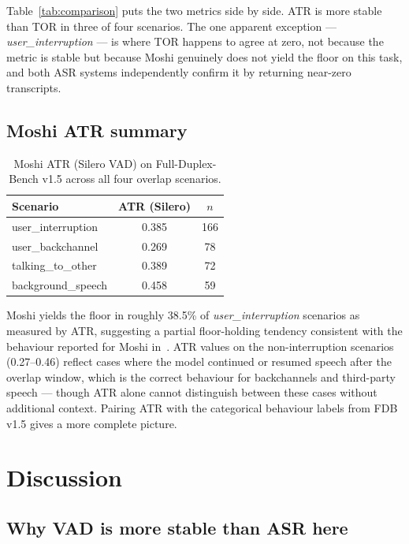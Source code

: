 \documentclass[a4paper]{article}
\begin{document}
Table~\ref{tab:comparison} puts the two metrics side by side. ATR is more
stable than TOR in three of four scenarios. The one apparent exception ---
\emph{user\_interruption} --- is where TOR happens to agree at zero, not
because the metric is stable but because Moshi genuinely does not yield the
floor on this task, and both ASR systems independently confirm it by
returning near-zero transcripts.

\subsection{Moshi ATR summary}

\begin{table}[t]
  \centering
  \caption{Moshi ATR (Silero VAD) on Full-Duplex-Bench v1.5 across all
           four overlap scenarios.}
  \label{tab:moshi_atr}
  \begin{tabular}{lcc}
    \toprule
    Scenario & ATR (Silero) & $n$ \\
    \midrule
    user\_interruption  & 0.385 & 166 \\
    user\_backchannel   & 0.269 &  78 \\
    talking\_to\_other  & 0.389 &  72 \\
    background\_speech  & 0.458 &  59 \\
    \bottomrule
  \end{tabular}
\end{table}

Moshi yields the floor in roughly 38.5\% of \emph{user\_interruption} scenarios
as measured by ATR, suggesting a partial floor-holding tendency consistent
with the behaviour reported for Moshi in~\cite{lin2025fullduplexv15}.
ATR values on the non-interruption scenarios (0.27--0.46) reflect cases where
the model continued or resumed speech after the overlap window, which is the
correct behaviour for backchannels and third-party speech --- though ATR alone
cannot distinguish between these cases without additional context. Pairing ATR
with the categorical behaviour labels from FDB v1.5 gives a more complete
picture.

\section{Discussion}
\label{sec:discussion}

\subsection{Why VAD is more stable than ASR here}
\end{document}
